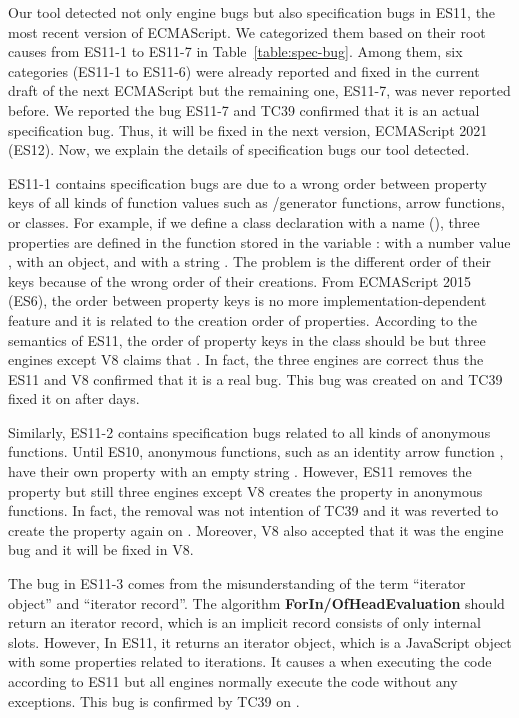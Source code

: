 Our tool detected not only engine bugs but also \inred{-} specification bugs in
ES11, the most recent version of ECMAScript. We categorized them based on their
root causes from ES11-1 to ES11-7 in Table~\ref{table:spec-bug}.  Among them,
six categories (ES11-1 to ES11-6) were already reported and fixed in the current
draft of the next ECMAScript but the remaining one, ES11-7, was never reported
before.  We reported the bug ES11-7 and TC39 confirmed that it is an actual
specification bug.  Thus, it will be fixed in the next version, ECMAScript 2021
(ES12).  Now, we explain the details of specification bugs our tool detected.

ES11-1 contains \inred{-} specification bugs are due to a wrong order between
property keys of all kinds of function values such as /generator
functions, arrow functions, or classes.  For example, if we define a class
declaration with a name  (), three properties are
defined in the function stored in the variable :  with a
number value ,  with an object, and  with a
string .  The problem is the different order of their keys because of
the wrong order of their creations.  From ECMAScript 2015 (ES6), the order
between property keys is no more implementation-dependent feature and it is
related to the creation order of properties.  According to the semantics of
ES11, the order of property keys in the class  should be  but three engines except V8 claims that .  In fact, the three engines are correct thus the ES11 and V8
confirmed that it is a real bug.  This bug was created on \inred{-} and TC39
fixed it on \inred{-} after \inred{-} days.

Similarly, ES11-2 contains \inred{-} specification bugs related to all kinds of
anonymous functions.  Until ES10, anonymous functions, such as an identity arrow
function , have their own property  with an empty string
.  However, ES11 removes the  property but still three
engines except V8 creates the  property in anonymous functions.  In
fact, the removal was not intention of TC39 and it was reverted to create the
property again on \inred{-}.  Moreover, V8 also accepted that it was the engine
bug and it will be fixed in V8.

The bug in ES11-3 comes from the misunderstanding of the term ``iterator
object'' and ``iterator record''.  The algorithm \textbf{ForIn/OfHeadEvaluation}
should return an iterator record, which is an implicit record consists of only
internal slots.  However, In ES11, it returns an iterator object, which is a
JavaScript object with some properties related to iterations.  It causes a
 when executing the code  according to
ES11 but all engines normally execute the code without any exceptions.  This bug
is confirmed by TC39 on \inred{-}.

